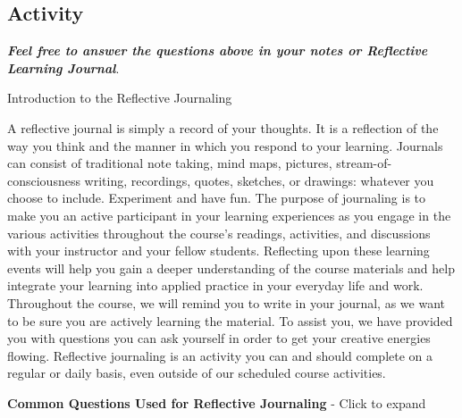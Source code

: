 \documentclass[
]{book}
\theoremstyle{definition}
\theoremstyle{definition}
\theoremstyle{definition}
\theoremstyle{definition}
\theoremstyle{remark}
\begin{document}
\hypertarget{activity-1}{%
\subsection*{Activity}\label{activity-1}}

\begin{reflect}
\textbf{\emph{Feel free to answer the questions above in your notes or Reflective Learning Journal}}.

{Introduction to the Reflective Journaling}

A reflective journal is simply a record of your thoughts. It is a reflection of the way you think and the manner in which you respond to your learning. Journals can consist of traditional note taking, mind maps, pictures, stream-of-consciousness writing, recordings, quotes, sketches, or drawings: whatever you choose to include. Experiment and have fun. The purpose of journaling is to make you an active participant in your learning experiences as you engage in the various activities throughout the course's readings, activities, and discussions with your instructor and your fellow students. Reflecting upon these learning events will help you gain a deeper understanding of the course materials and help integrate your learning into applied practice in your everyday life and work. Throughout the course, we will remind you to write in your journal, as we want to be sure you are actively learning the material. To assist you, we have provided you with questions you can ask yourself in order to get your creative energies flowing. Reflective journaling is an activity you can and should complete on a regular or daily basis, even outside of our scheduled course activities.

\textbf{Common Questions Used for Reflective Journaling} - Click to expand


\end{reflect}
\end{document}
